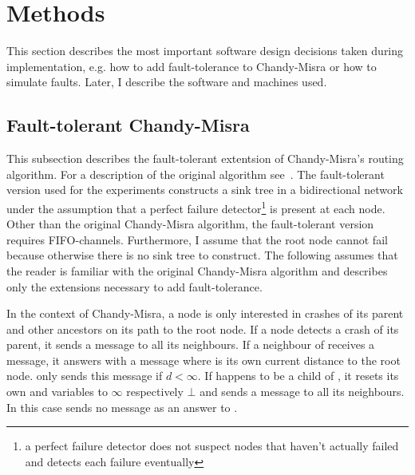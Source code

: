 \section{Methods}
\label{sec:methods}
This section describes the most important software design decisions taken during implementation, e.g. how to add fault-tolerance to Chandy-Misra or how to simulate faults.
Later, I describe the software and machines used.

\subsection {Fault-tolerant Chandy-Misra}
\label{ssec:fault-tolerant-chandy-misra}
This subsection describes the fault-tolerant extentsion of Chandy-Misra's routing algorithm.
For a description of the original algorithm see~\cite[page 56]{fokkink:2018}.
The fault-tolerant version used for the experiments constructs a sink tree in a bidirectional network under the assumption that a perfect failure detector\footnote{a perfect failure detector does not suspect nodes that haven't actually failed and detects each failure eventually} is present at each node.
Other than the original Chandy-Misra algorithm, the fault-tolerant version requires FIFO-channels.
Furthermore, I assume that the root node cannot fail because otherwise there is no sink tree to construct.
The following assumes that the reader is familiar with the original Chandy-Misra algorithm and describes only the extensions necessary to add fault-tolerance.

In the context of Chandy-Misra, a node is only interested in crashes of its parent and other ancestors on its path to the root node.
If a node  detects a crash of its parent, it sends a  message to all its neighbours.
If a neighbour  of  receives a  message, it answers with a  message where  is its own current distance to the root node.
 only sends this message if $d < \infty $.
If  happens to be a child of , it resets its own  and  variables to $\infty$ respectively $\bot$ and sends a  message to all its neighbours.
In this case  sends no  message as an answer to .

